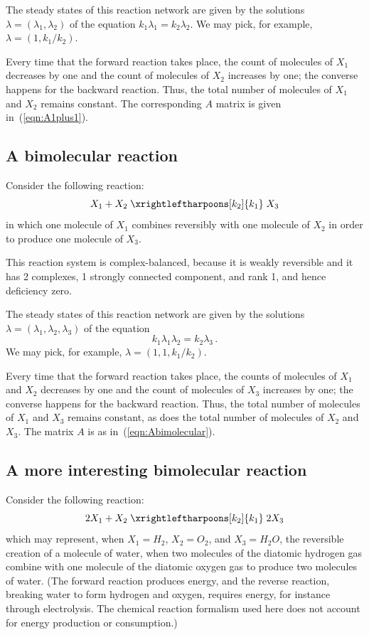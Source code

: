 \documentclass[11pt]{article}
\newcommand{\be}[1]{\begin{equation}\label{#1}}
\newcommand{\ee}{\end{equation}}
\newcommand{\arrowschem}[2]{\xrightleftharpoons[#1]{#2}}
\begin{document}
The steady states of this reaction network
are given by the solutions $\lambda =(\lambda _1,\lambda _2)$
of the equation $k_1\lambda _1=k_2\lambda _2$.  We may pick, for example,
$\lambda  = (1,k_1/k_2)$.

Every time that the forward reaction takes place, the count of molecules of
$X_1$ decreases by one and the count of molecules of $X_2$
increases by one; the converse happens for the backward reaction.
Thus, the total number of molecules of $X_1$ and $X_2$ remains constant.
The corresponding $A$ matrix is given in~(\ref{eqn:A1plus1}).

\subsection{A bimolecular reaction}

Consider the following reaction:
\be{eqn:bimolecular}
X_1 + X_2 \;\arrowschem{k_2}{k_1}\;  X_3
\ee
in which one molecule of $X_1$ combines reversibly with one molecule of
$X_2$ in order to produce one molecule of $X_3$.

This reaction system is complex-balanced, because it is weakly reversible and
it has 2 complexes, 1 strongly connected component, and rank 1, and hence
deficiency zero.

The steady states of this reaction network are given by the solutions
$\lambda =(\lambda _1,\lambda _2,\lambda _3)$
of the equation
\[
k_1\lambda _1\lambda _2=k_2\lambda _3 \,.
\]
We may pick, for example,
$\lambda  = (1,1,k_1/k_2)$.

Every time that the forward reaction takes place, the counts of molecules of
$X_1$ and $X_2$ decreases by one and the count of molecules of $X_3$
increases by one; the converse happens for the backward reaction.  
Thus, the total number of molecules of $X_1$ and $X_3$ remains constant, as
does the total number of molecules of $X_2$ and $X_3$.  
The matrix $A$ is as in~(\ref{eqn:Abimolecular}).

\subsection{A more interesting bimolecular reaction}

Consider the following reaction:
\be{eqn:water}
2X_1 + X_2 \;\arrowschem{k_2}{k_1}\; 2 X_3
\ee
which may represent, when $X_1=H_2$, $X_2 = O_2$, and $X_3 = H_2O$,
the reversible creation of a molecule of water, when two molecules of the
diatomic hydrogen gas combine with one molecule of the diatomic oxygen gas to
produce two molecules of water.  (The forward reaction produces energy, and the
reverse reaction, breaking water to form hydrogen and oxygen, requires energy,
for instance through electrolysis.  The chemical reaction formalism used here
does not account for energy production or consumption.)
\end{document}
